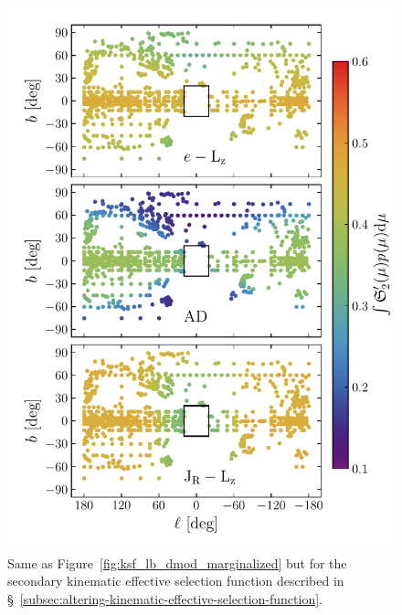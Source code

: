 \begin{figure}
    \centering
    \includegraphics[width=\halftextwidth]{figure/ch3/ksf2_lb_dmod_marginalized.pdf}
    \caption{Same as Figure~\ref{fig:ksf_lb_dmod_marginalized} but for the secondary kinematic effective selection function described in \S~\ref{subsec:altering-kinematic-effective-selection-function}.}
    \label{fig:ksf2_lb_dmod_marginalized}
\end{figure}